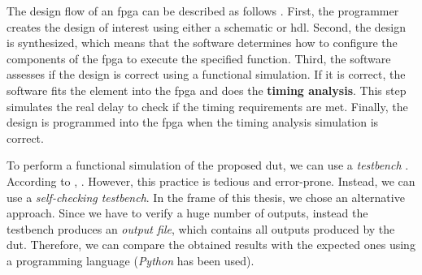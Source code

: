 The design flow of an \acrshort{fpga} can be described as follows \cite{barte_value-added_2011}. First, the programmer creates the design of interest using either a schematic or \acrshort{hdl}. Second, the design is synthesized, which means that the software determines how to configure the components of the \acrshort{fpga} to execute the specified function. Third, the software assesses if the design is correct using a functional simulation. If it is correct, the software fits the element into the \acrshort{fpga} and does the \textbf{timing analysis}. This step simulates the real delay to check if the timing requirements are met. Finally, the design is programmed into the \acrshort{fpga} when the timing analysis simulation is correct.

To perform a functional simulation of the proposed \acrfull{dut}, we can use a \textit{testbench} \cite{harris_digital_2015}. According to \textcite{harris_digital_2015}, . However, this practice is tedious and error-prone. Instead, we can use a \textit{self-checking testbench}. In the frame of this thesis, we chose an alternative approach. Since we have to verify a huge number of outputs, instead the testbench produces an \textit{output file}, which contains all outputs produced by the \acrshort{dut}. Therefore, we can compare the obtained results with the expected ones using a programming language (\textit{Python} has been used).